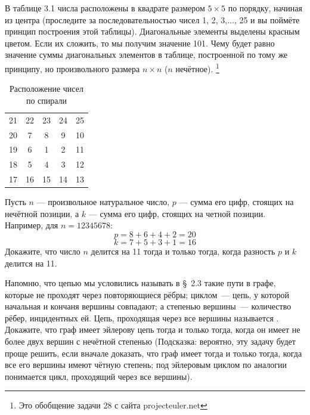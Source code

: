 \begin{exercise}
В таблице 3.1 числа расположены в квадрате размером $5\times 5$ по порядку, начиная из центра (проследите за последовательностью чисел 1, 2, 3,..., 25 и вы поймёте принцип построения этой таблицы). Диагональные элементы выделены красным цветом. Если их сложить, то мы получим значение 101. Чему будет равно значение суммы диагональных элементов в таблице, построенной по тому же принципу, но произвольного размера $n\times n$ ($n$ нечётное).
\footnote{Это обобщение задачи 28 с сайта projecteuler.net}
\end{exercise}

\begin{table}[h]
\centering
\begin{tabular}{ccccc}
{\color{red} 21} &22& 23& 24& {\color{red} 25}\\
20 & {\color{red} 7} & 8 & {\color{red} 9}& 10\\
19 & 6&  {\color{red} 1}&  2& 11\\
18 & {\color{red} 5} & 4 & {\color{red} 3}& 12\\
{\color{red} 17}& 16& 15& 14& {\color{red} 13}
\end{tabular}
\caption{Расположение чисел по спирали}
\end{table}

\begin{exercise}
Пусть $n$ --- произвольное натуральное число, $p$ --- сумма его цифр, стоящих на нечётной позиции, а $k$ --- сумма его цифр, стоящих на четной позиции. Например, для $n=12345678$:
$$p=8+6+4+2 = 20$$
$$k=7+5+3+1 = 16$$
Докажите, что число $n$ делится на 11 тогда и только тогда, когда разность $p$ и $k$ делится на 11.
\end{exercise}

\begin{exercise}
Напомню, что цепью мы условились называть в \S~2.3 такие пути в графе, которые не проходят через повторяющиеся рёбры; циклом~--- цепь, у которой начальная и кончаня вершины совпадают; а степенью вершины~--- количество рёбер, инцидентных ей. Цепь, проходящая через все вершины называется . Докажите, что граф имеет эйлерову цепь тогда и только тогда, когда он имеет не более двух вершин с нечётной степенью (Подсказка: вероятно, эту задачу будет проще решить, если вначале доказать, что граф имеет  тогда и только тогда, когда все его вершины имеют чётную степень; под эйлеровым циклом по аналогии понимается цикл, проходящий через все вершины).
\end{exercise}

